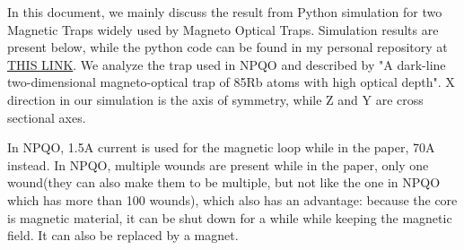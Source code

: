 \documentclass{article}
\begin{document}
	In this document, we mainly discuss the result from Python simulation for two Magnetic Traps widely used by Magneto Optical Traps. Simulation results are present below, while the python code can be found in my personal repository at \href{https://github.com/YJ-Yuan}{THIS LINK}. We analyze the trap used in NPQO and described by "A dark-line two-dimensional magneto-optical trap of 85Rb atoms with high optical depth". X direction in our simulation is the axis of symmetry, while Z and Y are cross sectional axes. 
	
	In NPQO, 1.5A current is used for the magnetic loop while in the paper, 70A instead. In NPQO, multiple wounds are present while in the paper, only one wound(they can also make them to be multiple, but not like the one in NPQO which has more than 100 wounds), which also has an advantage: because the core is magnetic material, it can be shut down for a while while keeping the magnetic field. It can also be replaced by a magnet. 
	
\end{document}
